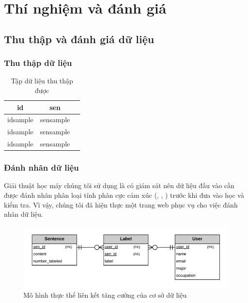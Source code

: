 \section{Thí nghiệm và đánh giá} \label{sec:thi-nghiem-va-danh-gia}
\subsection{Thu thập và đánh giá dữ liệu}
\subsubsection*{Thu thập dữ liệu}

\begin{table}[H]
\centering
\begin{minipage}{1.0\textwidth}
\caption{Tập dữ liệu thu thập được} 
\label{table:data}
\begin{tabular}{ |c|c|c| } 
 \hline
 id & sen \\ 
 \hline
 idsample & sensample \\ 
 idsample & sensample \\ 
 idsample & sensample \\ 
 \hline
\end{tabular}
\end{minipage}
\end{table}

\subsubsection*{Đánh nhãn dữ liệu}
Giải thuật học máy chúng tôi sử dụng là có giám sát nên dữ liệu đầu vào cần được đánh nhãn phân loại tính phân cực cảm xúc (\tichcuc, \tieucuc, \trungtinh) trước khi đưa vào học và kiểm tra. Vì vậy, chúng tôi đã hiện thực một trang web phục vụ cho việc đánh nhãn dữ liệu.\\

\begin{figure}[h]
\centering
\includegraphics[scale=0.25]{../hinh/EERD.png}
\caption{Mô hình thực thể liên kết tăng cường của cơ sở dữ liệu}
\label{fig:SQL}
\end{figure}

